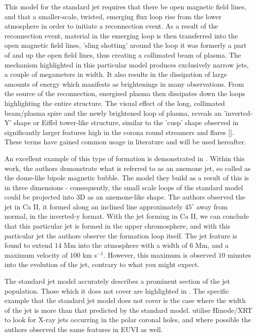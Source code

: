 This model for the standard jet requires that there be open magnetic field lines, and that a smaller-scale, twisted, emerging flux loop rise from the lower atmosphere in order to initiate a reconnection event.
As a result of the reconnection event, material in the emerging loop is then transferred into the open magnetic field lines, 'sling shotting' around the loop it was formerly a part of and up the open field lines, thus creating a collimated beam of plasma.
The mechanism highlighted in this particular model produces exclusively narrow jets, a couple of megameters in width.
It also results in the dissipation of large amounts of energy which manifests as brightenings in many observations.
From the source of the reconnection, energised plasma then dissipates down the loops highlighting the entire structure.
The visual effect of the long, collimated beam/plasma spire and the newly brightened loop of plasma, reveals an 'inverted-Y' shape or Eiffel tower-like structure, similar to the 'cusp' shape observed in significantly larger features high in the corona round streamers and flares [\cite{Vourlidas2006}].
These terms have gained common usage in literature and will be used hereafter. 

An excellent example of this type of formation is demonstrated in \cite{Nishizuka2011}.
Within this work, the authors demonstrate what is referred to as an anemone jet, so called as the dome-like bipole magnetic bubble.
The model they build as a result of this is in three dimensions - consequently, the small scale loops of the standard model could be projected into $3$D as an anemone-like shape.
The authors observed the jet in Ca II, it formed along an inclined line approximately $45^\circ$ away from normal, in the inverted-y format.
With the jet forming in Ca II, we can conclude that this particular jet is formed in the upper chromosphere, and with this particular jet the authors observe the formation loop itself.
The jet feature is found to extend $14$ Mm into the atmosphere with a width of $6$ Mm, and a maximum velocity of $100$ km s$^{-1}$.
However, this maximum is observed $10$ minutes into the evolution of the jet, contrary to what you might expect.

The standard jet model accurately describes a prominent section of the jet population.
Those which it does not cover are highlighted in \cite{Moore2010}.
The specific example that the standard jet model does not cover is the case where the width of the jet is more than that predicted by the standard model.
\cite{Moore2010} utilise Hinode/XRT to look for X-ray jets occurring in the polar coronal holes, and where possible the authors observed the same features in EUVI as well.

